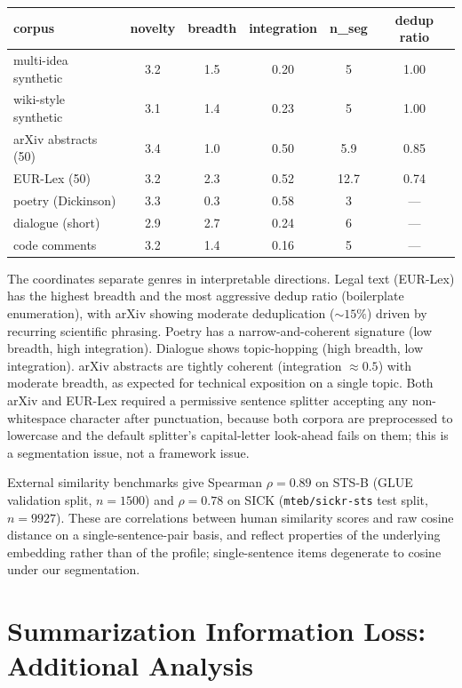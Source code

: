 \documentclass[11pt]{article}
\begin{document}
\begin{center}
\begin{tabular}{lccccc}
\toprule
corpus & novelty & breadth & integration & n\_seg & dedup ratio \\
\midrule
multi-idea synthetic & 3.2 & 1.5 & 0.20 & 5 & 1.00 \\
wiki-style synthetic & 3.1 & 1.4 & 0.23 & 5 & 1.00 \\
arXiv abstracts (50) & 3.4 & 1.0 & 0.50 & 5.9 & 0.85 \\
EUR-Lex (50) & 3.2 & 2.3 & 0.52 & 12.7 & 0.74 \\
poetry (Dickinson) & 3.3 & 0.3 & 0.58 & 3 & --- \\
dialogue (short) & 2.9 & 2.7 & 0.24 & 6 & --- \\
code comments & 3.2 & 1.4 & 0.16 & 5 & --- \\
\bottomrule
\end{tabular}
\end{center}

The coordinates separate genres in interpretable directions. Legal text (EUR-Lex) has the highest breadth and the most aggressive dedup ratio (boilerplate enumeration), with arXiv showing moderate deduplication ($\sim 15\%$) driven by recurring scientific phrasing. Poetry has a narrow-and-coherent signature (low breadth, high integration). Dialogue shows topic-hopping (high breadth, low integration). arXiv abstracts are tightly coherent (integration $\approx 0.5$) with moderate breadth, as expected for technical exposition on a single topic. Both arXiv and EUR-Lex required a permissive sentence splitter accepting any non-whitespace character after punctuation, because both corpora are preprocessed to lowercase and the default splitter's capital-letter look-ahead fails on them; this is a segmentation issue, not a framework issue.

External similarity benchmarks give Spearman $\rho = 0.89$ on STS-B (GLUE validation split, $n = 1500$) and $\rho = 0.78$ on SICK (\texttt{mteb/sickr-sts} test split, $n = 9927$). These are correlations between human similarity scores and raw cosine distance on a single-sentence-pair basis, and reflect properties of the underlying embedding rather than of the profile; single-sentence items degenerate to cosine under our segmentation.


\section{Summarization Information Loss: Additional Analysis}\label{app:summarization}
\end{document}
